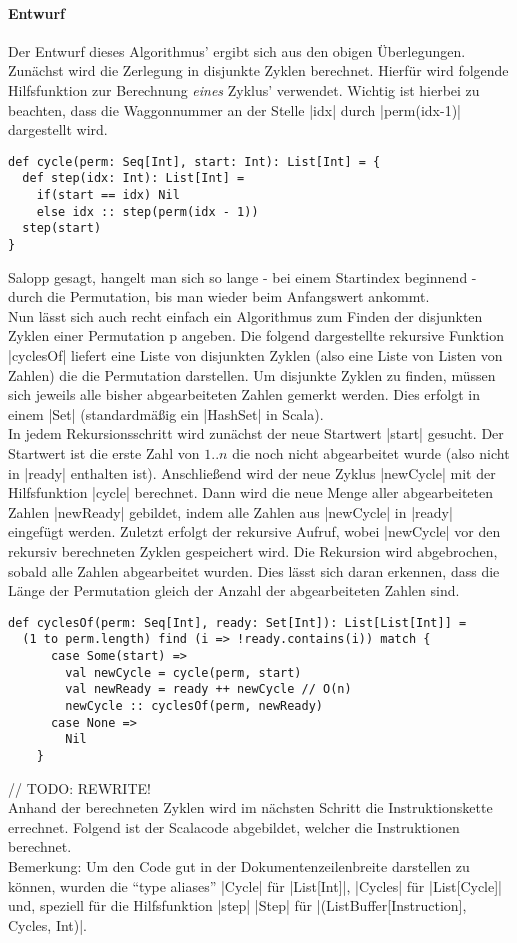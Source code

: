 \paragraph{Entwurf}
\label{slow_cycler}
Der Entwurf dieses Algorithmus' ergibt sich aus den obigen Überlegungen. Zunächst wird die Zerlegung in disjunkte Zyklen berechnet.
Hierfür wird folgende Hilfsfunktion zur Berechnung \emph{eines} Zyklus' verwendet.
Wichtig ist hierbei zu beachten, dass die Waggonnummer an der Stelle |idx| durch |perm(idx-1)| dargestellt wird.
\lstset{language=Scala}
\lstset{basicstyle=\small}
\begin{lstlisting}
def cycle(perm: Seq[Int], start: Int): List[Int] = {
  def step(idx: Int): List[Int] =
    if(start == idx) Nil
    else idx :: step(perm(idx - 1))
  step(start)
}
\end{lstlisting}
Salopp gesagt, hangelt man sich so lange - bei einem Startindex beginnend - durch die Permutation, bis man wieder beim Anfangswert ankommt.\\
Nun lässt sich auch recht einfach ein Algorithmus zum Finden der disjunkten Zyklen einer Permutation p angeben.
Die folgend dargestellte rekursive Funktion |cyclesOf| liefert eine Liste von disjunkten Zyklen (also eine Liste von Listen von Zahlen)
die die Permutation darstellen. Um disjunkte Zyklen zu finden, müssen sich jeweils alle bisher abgearbeiteten Zahlen gemerkt werden.
Dies erfolgt in einem |Set| (standardmäßig ein |HashSet| in Scala). \\
In jedem Rekursionsschritt wird zunächst der neue Startwert |start| gesucht.
Der Startwert ist die erste Zahl von $1..n$ die noch nicht abgearbeitet wurde (also nicht in |ready| enthalten ist).
Anschließend wird der neue Zyklus |newCycle| mit der Hilfsfunktion |cycle| berechnet.
Dann wird die neue Menge aller abgearbeiteten Zahlen |newReady| gebildet, indem alle Zahlen aus |newCycle| in |ready| eingefügt werden.
Zuletzt erfolgt der rekursive Aufruf, wobei |newCycle| vor den rekursiv berechneten Zyklen gespeichert wird.
Die Rekursion wird abgebrochen, sobald alle Zahlen abgearbeitet wurden. Dies lässt sich daran erkennen,
dass die Länge der Permutation gleich der Anzahl der abgearbeiteten Zahlen sind. \\
\lstset{language=Scala}
\lstset{basicstyle=\small}
\begin{lstlisting}
def cyclesOf(perm: Seq[Int], ready: Set[Int]): List[List[Int]] =
  (1 to perm.length) find (i => !ready.contains(i)) match {
      case Some(start) =>
        val newCycle = cycle(perm, start)
        val newReady = ready ++ newCycle // O(n)
        newCycle :: cyclesOf(perm, newReady)
      case None =>
        Nil
    }
\end{lstlisting}
// TODO: REWRITE! \\
Anhand der berechneten Zyklen wird im nächsten Schritt die Instruktionskette errechnet.
Folgend ist der Scalacode abgebildet, welcher die Instruktionen berechnet. \\
Bemerkung: Um den Code gut in der Dokumentenzeilenbreite darstellen zu können,
wurden die ``type aliases'' |Cycle| für |List[Int]|, |Cycles| für |List[Cycle]| und,
speziell für die Hilfsfunktion |step| |Step| für |(ListBuffer[Instruction], Cycles, Int)|.

